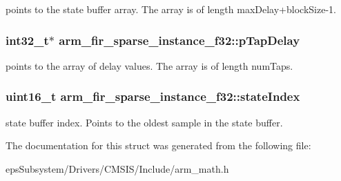 points to the state buffer array. The array is of length max\-Delay+block\-Size-\/1. \hypertarget{structarm__fir__sparse__instance__f32_aaa54ae67e5d10c6dd0d697945c638d31}{
\subsubsection[{p\-Tap\-Delay}]{\setlength{\rightskip}{0pt plus 5cm}int32\-\_\-t$\ast$ arm\-\_\-fir\-\_\-sparse\-\_\-instance\-\_\-f32\-::p\-Tap\-Delay}}\label{structarm__fir__sparse__instance__f32_aaa54ae67e5d10c6dd0d697945c638d31}
points to the array of delay values. The array is of length num\-Taps. \hypertarget{structarm__fir__sparse__instance__f32_a57585aeca9dc8686e08df2865375a86d}{
\subsubsection[{state\-Index}]{\setlength{\rightskip}{0pt plus 5cm}uint16\-\_\-t arm\-\_\-fir\-\_\-sparse\-\_\-instance\-\_\-f32\-::state\-Index}}\label{structarm__fir__sparse__instance__f32_a57585aeca9dc8686e08df2865375a86d}
state buffer index. Points to the oldest sample in the state buffer. 

The documentation for this struct was generated from the following file\-:\begin{DoxyCompactItemize}
\item 
eps\-Subsystem/\-Drivers/\-C\-M\-S\-I\-S/\-Include/arm\-\_\-math.\-h\end{DoxyCompactItemize}

